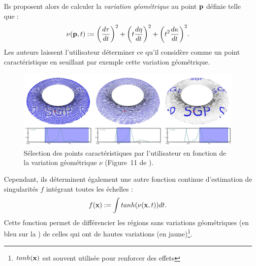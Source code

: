 Ils proposent alors de calculer la \emph{variation géométrique} au point $\mathbf{p}$
définie telle que :
%
\begin{equation}
  \nu(\mathbf{p},t) :=
  {\left(
    \frac{d\tau}{dt} \right)}^2
    + {\left( t\frac{d\eta}{dt}
  \right)}^2
  + {\left( t^2\frac{d\kappa}{dt} \right)}^2.
\end{equation}
%
Les auteurs laissent l'utilisateur déterminer ce qu'il considère comme un point
caractéristique en seuillant par exemple cette variation géométrique.

\begin{figure}[ht]{
    \begin{center}
    \includegraphics[width=14cm]{images/Feature/Mellado_multiscale}
    \end{center}}
    \caption[Sélection des points caractéristiques par l'utilisateur.]{Sélection des points caractéristiques par l'utilisateur en fonction de la variation géométrique $\nu$ (Figure~11 de \cite{Mellado2012}).
      \label{fig:mellado-multiscale}}
\end{figure}

Cependant, ils déterminent également une autre fonction continue d'estimation de
singularités $f$ intégrant toutes les échelles :
%
\begin{equation}
   f(\mathbf{x}) := \int tanh(\nu(\mathbf{x},t)) dt .
\end{equation}
%
Cette fonction permet de différencier les régions sans variations géométriques (en bleu sur
la ) de celles qui ont de hautes variations
(en jaune)\footnote{$tanh(\mathbf{x})$ est souvent utilisée pour renforcer des
effets}.


